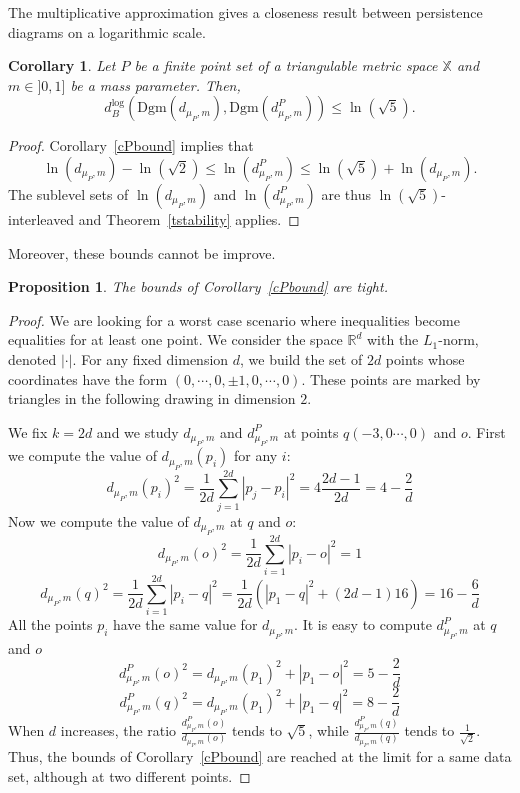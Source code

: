 \documentclass[a4paper]{article}
\newcommand\dmP{d_{\mu_P,m}}
\newcommand\dPP{d_{\mu_P,m}^P}
\newcommand\X{\mathbb{X}}
\newcommand\R{\mathbb{R}}
\newcommand\Dgm[1]{\mathrm{Dgm}(#1)}
\newcommand\dbl{d_B^{\mathrm{log}}}
\newtheorem{corollary}[theorem]{Corollary}
\newtheorem{proposition}[theorem]{Proposition}
\begin{document}
The multiplicative approximation gives a closeness result between persistence diagrams on a logarithmic scale.

\begin{corollary}\label{cLogbound}
Let $P$ be a finite point set of a triangulable metric space $\X$ and $m\in]0,1]$ be a mass parameter.
Then,
$$\dbl(\Dgm{\dmP},\Dgm{\dPP})\leq\ln(\sqrt{5}).$$
\end{corollary}

\begin{proof}
Corollary~\ref{cPbound} implies that
$$\ln(\dmP)-\ln(\sqrt{2})\leq\ln(\dPP)\leq\ln(\sqrt{5})+\ln(\dmP).$$
The sublevel sets of $\ln(\dmP)$ and $\ln(\dPP)$ are thus $\ln(\sqrt{5})$-interleaved and Theorem~\ref{tstability} applies.
\end{proof}

Moreover, these bounds cannot be improve.

\begin{proposition}
The bounds of Corollary~\ref{cPbound} are tight.
\end{proposition}

\begin{proof}
We are looking for a worst case scenario where inequalities become equalities for at least one point.  
We consider the space $\R^d$ with the $L_1$-norm, denoted $|\cdot|$.
For any fixed dimension $d$, we build the set of $2d$ points whose coordinates have the form $(0, \cdots, 0, \pm 1, 0, \cdots, 0)$. 
These points are marked by triangles in the following drawing in dimension $2$.
\begin{center}
\end{center}
We fix $k=2d$ and we study $\dmP$ and $\dPP$ at points $q(-3,0\cdots,0)$ and $o$.
First we compute the value of $\dmP(p_i)$ for any $i$:
$$\dmP(p_i)^2=\frac{1}{2d}\sum_{j=1}^{2d}|p_j-p_i|^2=4\frac{2d-1}{2d}=4-\frac{2}{d}$$
Now we compute the value of $\dmP$ at $q$ and $o$:
$$\dmP(o)^2=\frac{1}{2d}\sum_{i=1}^{2d}|p_i-o|^2=1$$
$$\dmP(q)^2=\frac{1}{2d}\sum_{i=1}^{2d}|p_i-q|^2=\frac{1}{2d}(|p_1-q|^2+(2d-1)16)=16-\frac{6}{d}$$
All the points $p_i$ have the same value for $\dmP$.
It is easy to compute $\dPP$ at $q$ and $o$
$$\dPP(o)^2=\dmP(p_1)^2+|p_1-o|^2=5-\frac{2}{d}$$
$$\dPP(q)^2=\dmP(p_1)^2+|p_1-q|^2=8-\frac{2}{d}$$ When $d$ increases,
the ratio $\frac{\dPP(o)}{\dmP(o)}$ tends to $\sqrt{5}$, while
$\frac{\dPP(q)}{\dmP(q)}$ tends to $\frac{1}{\sqrt{2}}$.  
Thus, the bounds of Corollary~\ref{cPbound} are reached at the limit for a same data set, although at two different points.
\end{proof}
\end{document}
